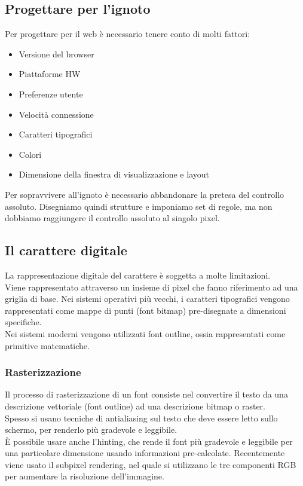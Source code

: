 \documentclass{article}
\begin{document}
\subsection{Progettare per l'ignoto}
Per progettare per il web è necessario tenere conto di molti fattori:
\begin{itemize}
\item Versione del browser
\item Piattaforme HW 
\item Preferenze utente
\item Velocità connessione
\item Caratteri tipografici
\item Colori
\item Dimensione della finestra di visualizzazione e layout
\end{itemize}
Per sopravvivere all'ignoto è necessario abbandonare la pretesa del controllo assoluto. Disegniamo quindi strutture e imponiamo set di regole, ma non dobbiamo raggiungere il controllo assoluto al singolo pixel.
\subsection{Il carattere digitale}
La rappresentazione digitale del carattere è soggetta a molte limitazioni.\\
Viene rappresentato attraverso un insieme di pixel che fanno riferimento ad una griglia di base. Nei sistemi operativi più vecchi, i caratteri tipografici vengono rappresentati come mappe di punti (font bitmap) pre-disegnate a dimensioni specifiche.\\
Nei sistemi moderni vengono utilizzati font outline, ossia rappresentati come primitive matematiche.\\
\subsubsection{Rasterizzazione}
Il processo di rasterizzazione di un font consiste nel convertire il testo da una descrizione vettoriale (font outline) ad una descrizione bitmap o raster.\\
Spesso si usano tecniche di antialiasing sul testo che deve essere letto sullo schermo, per renderlo più gradevole e leggibile.\\
È possibile usare anche l'hinting, che rende il font più gradevole e leggibile per una particolare dimensione usando informazioni pre-calcolate. Recentemente viene usato il subpixel rendering, nel quale si utilizzano le tre componenti RGB per aumentare la risoluzione dell'immagine.
\end{document}
